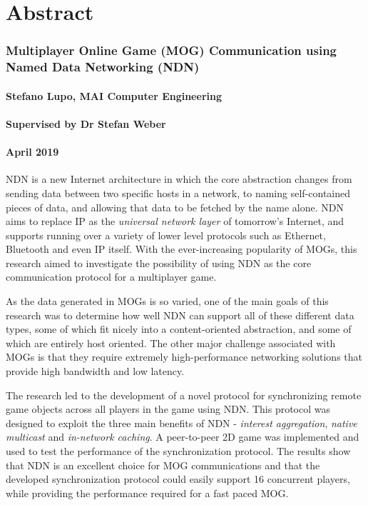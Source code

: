 \chapter*{Abstract}
\subsection*{Multiplayer Online Game (MOG) Communication using Named Data Networking (NDN)}
\subsubsection*{Stefano Lupo, MAI Computer Engineering}
\subsubsection*{Supervised by Dr Stefan Weber}
\subsubsection*{April 2019}
NDN is a new Internet architecture in which the core abstraction changes from sending data between two specific hosts in a network, to naming self-contained pieces of data, and allowing that data to be fetched by the name alone. NDN aims to replace IP as the \textit{universal network layer} of tomorrow's Internet, and supports running over a variety of lower level protocols such as Ethernet, Bluetooth and even IP itself. With the ever-increasing popularity of MOGs, this research aimed to investigate the possibility of using NDN as the core communication protocol for a multiplayer game.

As the data generated in MOGs is so varied, one of the main goals of this research was to determine how well NDN can support all of these different data types, some of which fit nicely into a content-oriented abstraction, and some of which are entirely host oriented. The other major challenge associated with MOGs is that they require extremely high-performance networking solutions that provide high bandwidth and low latency.

The research led to the development of a novel protocol for synchronizing remote game objects across all players in the game using NDN. This protocol was designed to exploit the three main benefits of NDN - \textit{interest aggregation}, \textit{native multicast} and \textit{in-network caching}. A peer-to-peer 2D game was implemented and used to test the performance of the synchronization protocol. The results show that NDN is an excellent choice for MOG communications and that the developed synchronization protocol could easily support 16 concurrent players, while providing the performance required for a fast paced MOG. 